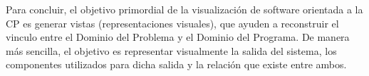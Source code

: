 Para concluir, el objetivo primordial de la visualización de software orientada a la CP es generar vistas (representaciones visuales), que ayuden a reconstruir el vinculo entre el Dominio del Problema y el Dominio del Programa. De manera más sencilla, el objetivo es representar visualmente la salida del sistema, los componentes utilizados para dicha salida y la relación que existe entre ambos.







 



